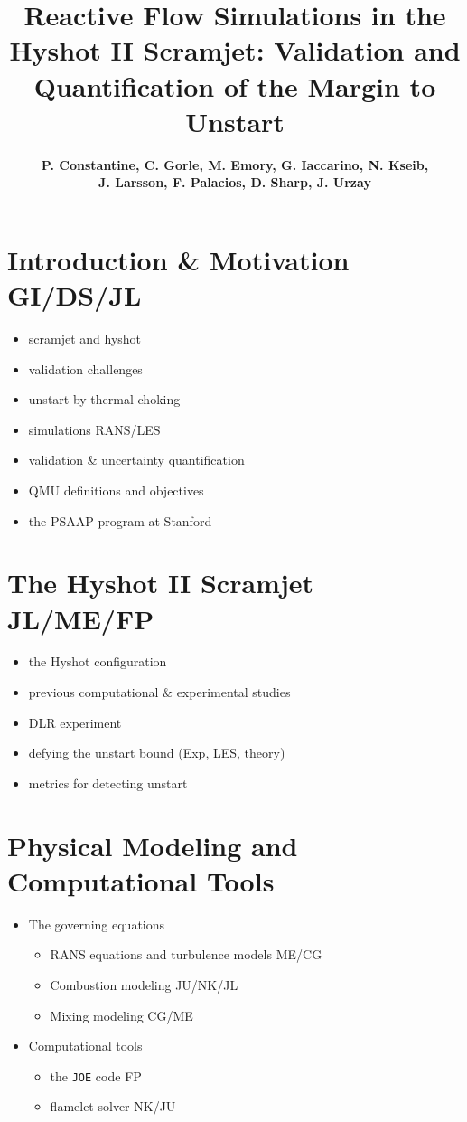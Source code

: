 \documentclass[11pt]{article}
\begin{document}
\title{\bf\color{blue} Reactive Flow Simulations in the Hyshot II Scramjet: Validation and Quantification of the Margin to Unstart}
\author{\bf P. Constantine, C. Gorle, M. Emory, G. Iaccarino, N. Kseib, \\ \bf J. Larsson, F. Palacios, D. Sharp, J. Urzay}
\date{}
\maketitle

\section{Introduction \& Motivation \color{red} GI/DS/JL}
\begin{itemize}
\item scramjet and hyshot 
\item validation challenges
\item unstart by thermal choking
\item simulations RANS/LES
\item validation \& uncertainty quantification
\item QMU definitions and objectives
\item the PSAAP program at Stanford
\end{itemize}

\section{The Hyshot II Scramjet \color{red} JL/ME/FP}
\begin{itemize}
\item the Hyshot configuration
\item previous computational \& experimental studies
\item DLR experiment
\item defying the unstart bound (Exp, LES, theory)
\item metrics for detecting unstart 
\end{itemize}

\section{Physical Modeling and Computational Tools}
\begin{itemize}
\item The governing equations
\begin{itemize} 
\item RANS equations and turbulence models {\color{red} ME/CG}
\item Combustion modeling {\color{red} JU/NK/JL}
\item Mixing modeling {\color{red} CG/ME}
\end{itemize}
\item Computational tools
\begin{itemize}
\item the {\tt JOE} code  {\color{red} FP}
\item flamelet solver  {\color{red} NK/JU}
\end{itemize}
\end{itemize}
\end{document}
